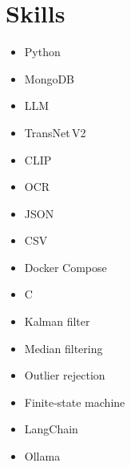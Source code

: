\documentclass[11pt,a4paper]{article}
\begin{document}
\section*{Skills}
\begin{itemize}
  \item Python
  \item MongoDB
  \item LLM
  \item TransNet V2
  \item CLIP
  \item OCR
  \item JSON
  \item CSV
  \item Docker Compose
  \item C
  \item Kalman filter
  \item Median filtering
  \item Outlier rejection
  \item Finite‑state machine
  \item LangChain
  \item Ollama
\end{itemize}
\end{document}
